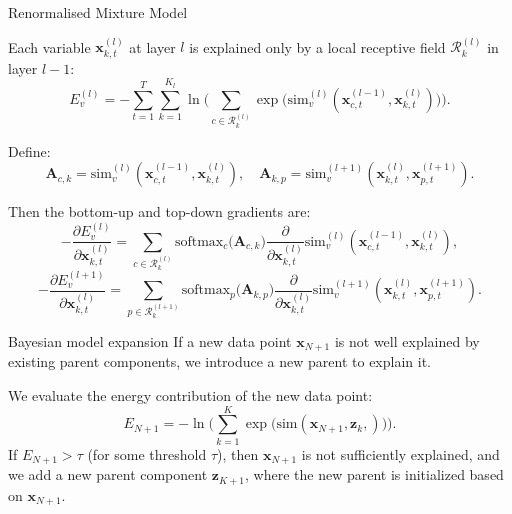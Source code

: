 \documentclass{beamer}
\begin{document}
\begin{frame}{Renormalised Mixture Model}

    Each variable \(\bm{x}_{k,t}^{(l)}\) at layer \(l\) is explained only by a local receptive field \(\mathcal{R}_{k}^{(l)}\) in layer \(l-1\):
    \[
    E_{v}^{(l)}
    =
    -\sum_{t=1}^{T}
    \sum_{k=1}^{K_l}
    \ln \Biggl(
    \sum_{c \in \mathcal{R}_{k}^{(l)}}
    \exp\bigl(\mathrm{sim}_{v}^{(l)}(\bm{x}_{c,t}^{(l-1)}, \bm{x}_{k,t}^{(l)})\bigr)
    \Biggr).
    \]

    Define:  
    \[
    \bm{A}_{c,k} = \mathrm{sim}_{v}^{(l)}(\bm{x}_{c,t}^{(l-1)}, \bm{x}_{k,t}^{(l)}),
    \quad
    \bm{A}_{k,p} = \mathrm{sim}_{v}^{(l+1)}(\bm{x}_{k,t}^{(l)}, \bm{x}_{p,t}^{(l+1)}).
    \]

    Then the bottom-up and top-down gradients are:  
    \[
    -\frac{\partial E_{v}^{(l)}}{\partial \bm{x}_{k,t}^{(l)}}
    =
    \sum_{c \in \mathcal{R}_{k}^{(l)}}
    \mathrm{softmax}_{c}\bigl(\bm{A}_{c,k}\bigr)
    \frac{\partial}{\partial \bm{x}_{k,t}^{(l)}}
    \mathrm{sim}_{v}^{(l)}(\bm{x}_{c,t}^{(l-1)}, \bm{x}_{k,t}^{(l)}),
    \]
    \[
    -\frac{\partial E_{v}^{(l+1)}}{\partial \bm{x}_{k,t}^{(l)}}
    =
    \sum_{p \in \mathcal{R}_{k}^{(l+1)}}
    \mathrm{softmax}_{p}\bigl(\bm{A}_{k,p}\bigr)
    \frac{\partial}{\partial \bm{x}_{k,t}^{(l)}}
    \mathrm{sim}_{v}^{(l+1)}(\bm{x}_{k,t}^{(l)}, \bm{x}_{p,t}^{(l+1)}).
    \]

\end{frame}


\begin{frame}{Bayesian model expansion}
    If a new data point \(\bm{x}_{N+1}\) is not well explained by existing parent components, we introduce a new parent to explain it.

    We evaluate the energy contribution of the new data point:
    \[
    E_{N+1} = -\ln \Biggl( \sum_{k=1}^{K} \exp\bigl(\mathrm{sim}(\bm{x}_{N+1}, \bm{z}_k,)\bigr) \Biggr).
    \]
    If \(E_{N+1} > \tau\) (for some threshold \(\tau\)), then \(\bm{x}_{N+1}\) is not sufficiently explained, and we add a new parent component \(\bm{z}_{K+1}\), where the new parent is initialized based on \(\bm{x}_{N+1}\).

\end{frame}
\end{document}
